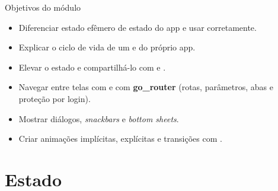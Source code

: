 \documentclass[aspectratio=169,10pt]{beamer}
\begin{document}
\capa

\begin{frame}{Objetivos do módulo}
  \begin{conceito}
    \begin{itemize}
      \item Diferenciar estado efêmero de estado do app e usar  corretamente.
      \item Explicar o ciclo de vida de um  e do próprio app.
      \item Elevar o estado e compartilhá-lo com  e .
      \item Navegar entre telas com  e com \textbf{go\_router} (rotas, parâmetros, abas e proteção por login).
      \item Mostrar diálogos, \emph{snackbars} e \emph{bottom sheets}.
      \item Criar animações implícitas, explícitas e transições com .
    \end{itemize}
  \end{conceito}
\end{frame}

\sumario



\section{Estado}
\end{document}

